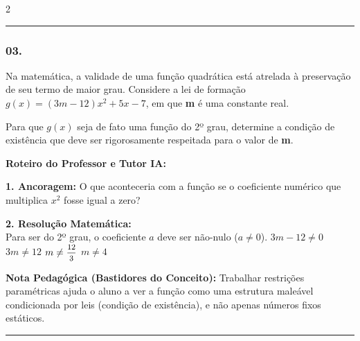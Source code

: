 \begin{multicols*}{2}
\noindent\textcolor{CorLinha}{\rule{\linewidth}{0.5pt}} 
\par\vspace{\espacoPreQuestao}
\subsubsection*{03.} 
\begin{enunciadoLiteral}
Na matemática, a validade de uma função quadrática está atrelada à preservação de seu termo de maior grau. Considere a lei de formação $g(x) = (3m - 12)x^2 + 5x - 7$, em que \textbf{m} é uma constante real.

Para que $g(x)$ seja de fato uma função do 2º grau, determine a condição de existência que deve ser rigorosamente respeitada para o valor de \textbf{m}.
\end{enunciadoLiteral}

\ifgabarito
    \begin{tcolorbox}[colback=CorTitUm!5, colframe=CorTitUm, boxrule=1pt, arc=4pt, left=6pt, right=6pt, top=6pt, bottom=6pt]
    \small\textbf{\textcolor{CorTitUm}{Roteiro do Professor e Tutor IA:}}\par\vspace{0.1cm}
    \color{CinzaEscuro}
    \textbf{1. Ancoragem:} O que aconteceria com a função se o coeficiente numérico que multiplica $x^2$ fosse igual a zero?\par\vspace{0.1cm}
    \textbf{2. Resolução Matemática:}\\
    Para ser do 2º grau, o coeficiente $a$ deve ser não-nulo ($a \neq 0$).
    $3m - 12 \neq 0$
    $3m \neq 12$
    $m \neq \mfrac{12}{3}$
    $m \neq 4$
    \end{tcolorbox}
    \vspace{0.15cm}
    
    \begin{boxexplicacao}
    \textbf{Nota Pedagógica (Bastidores do Conceito):} Trabalhar restrições paramétricas ajuda o aluno a ver a função como uma estrutura maleável condicionada por leis (condição de existência), e não apenas números fixos estáticos.
    \end{boxexplicacao}
\fi

\par\vspace{\espacoQuestao}

\noindent\textcolor{CorLinha}{\rule{\linewidth}{0.5pt}} 
\par\vspace{\espacoPreQuestao}

\end{multicols*}
